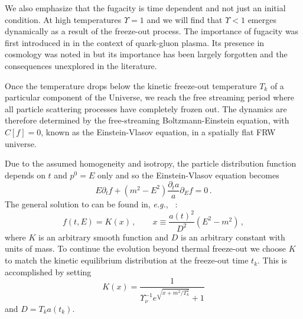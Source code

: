  We also emphasize that the fugacity is time dependent and not just an initial condition. At high temperatures $\Upsilon=1$ and we will find that $\Upsilon<1$ emerges dynamically as a result of the freeze-out process. The importance of fugacity was first introduced in \cite{Rafelski:1982pu} in the context of quark-gluon plasma. Its presence in cosmology was noted in \cite{Bernstein:1985th,Dolgov:1992wf} but its importance has been largely forgotten and the consequences unexplored in the literature. 




Once the temperature drops below the kinetic freeze-out temperature $T_k$ of a particular component of the Universe, we reach the free streaming period where all particle scattering processes have completely frozen out. The dynamics are therefore determined by the free-streaming Boltzmann-Einstein equation,  with $C[f]=0$, known as the Einstein-Vlasov equation, in a spatially flat FRW universe.

Due to the assumed homogeneity and isotropy, the particle distribution function depends on $t$ and $p^0=E$ only and so the Einstein-Vlasov equation becomes
\begin{equation}\label{VEeqFLR}
E\partial_tf+(m^2-E^2)\frac{\partial_ta}{a}\partial_{E}f=0\,.
\end{equation}
The general solution to  can be found in, {\it e.g.\/}, ~\cite{Choquet-Bruhat:2009xil,Wong:2011ip}:
\begin{equation}\label{general_sol}
f(t,E)=K(x)\,,\qquad
x\equiv\frac{a(t)^2}{D^2}(E^2-m^2)\,,
\end{equation}
where $K$ is an arbitrary smooth function and $D$ is an arbitrary constant with units of mass. To continue the evolution beyond thermal freeze-out we choose $K$ to match the kinetic equilibrium distribution  at the freeze-out time $t_k$. This is accomplished by setting
\begin{equation}\label{K_func}
K(x)=\frac{1}{\Upsilon_\nu^{-1}e^{\sqrt{x+m^2/T_k^2}}+ 1}
\end{equation}
and $D=T_k a(t_k)$. 

